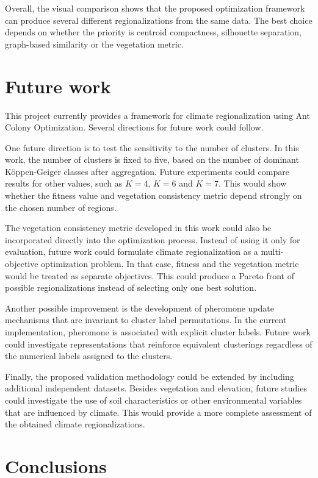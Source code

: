 \documentclass[11pt]{article}
\begin{document}
Overall, the visual comparison shows that the proposed optimization framework can produce several different regionalizations from the same data. The best choice depends on whether the priority is centroid compactness, silhouette separation, graph-based similarity or the vegetation metric.

\section{Future work}
\label{sec:future}

This project currently provides a framework for climate regionalization using Ant Colony Optimization. Several directions for future work could follow.

One future direction is to test the sensitivity to the number of clusters. In this work, the number of clusters is fixed to five, based on the number of dominant Köppen-Geiger classes after aggregation. Future experiments could compare results for other values, such as $K=4$, $K=6$ and $K=7$. This would show whether the fitness value and vegetation consistency metric depend strongly on the chosen number of regions.

The vegetation consistency metric developed in this work could also be incorporated directly into the optimization process. Instead of using it only for evaluation, future work could formulate climate regionalization as a multi-objective optimization problem. In that case, fitness and the vegetation metric would be treated as separate objectives. This could produce a Pareto front of possible regionalizations instead of selecting only one best solution.

Another possible improvement is the development of pheromone update mechanisms that are invariant to cluster label permutations. In the current implementation, pheromone is associated with explicit cluster labels. Future work could investigate representations that reinforce equivalent clusterings regardless of the numerical labels assigned to the clusters.

Finally, the proposed validation methodology could be extended by including additional independent datasets. Besides vegetation and elevation, future studies could investigate the use of soil characteristics or other environmental variables that are influenced by climate. This would provide a more complete assessment of the obtained climate regionalizations.

\section{Conclusions}
\end{document}
